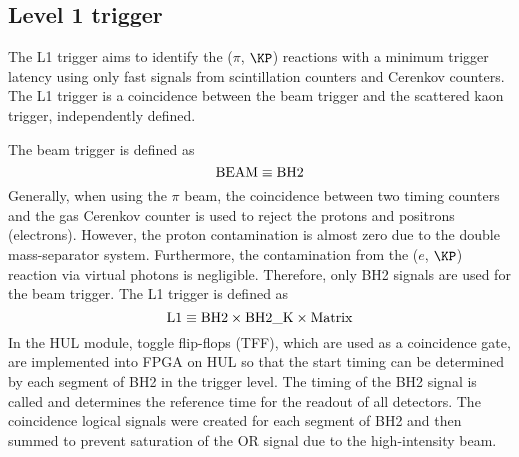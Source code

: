 \subsection{Level 1 trigger}
The L1 trigger aims to identify the ($\pi$, $\KP$) reactions with a minimum trigger latency using only fast signals from scintillation counters and Cerenkov counters. The L1 trigger is a coincidence between the beam trigger and the scattered kaon trigger, independently defined. 

The beam trigger is defined as 
\begin{equation}
  {\rm BEAM \equiv BH2}
\end{equation}
Generally, when using the $\pi$ beam, the coincidence between two timing counters and the gas Cerenkov counter is used to reject the protons and positrons (electrons). However, the proton contamination is almost zero due to the double mass-separator system. Furthermore, the contamination from the ($e$, $\KP$) reaction via virtual photons is negligible. Therefore, only BH2 signals are used for the beam trigger. The L1 trigger is defined as
\begin{equation}
  {\rm L1 \equiv BH2\times BH2\_K \times Matrix }
\end{equation}
In the HUL module, toggle flip-flops (TFF), which are used as a coincidence gate, are implemented into FPGA on HUL so that the start timing can be determined by each segment of BH2 in the trigger level. The timing of the BH2 signal is called  and determines the reference time for the readout of all detectors. The coincidence logical signals were created for each segment of BH2 and then summed to prevent saturation of the OR signal due to the high-intensity beam.


